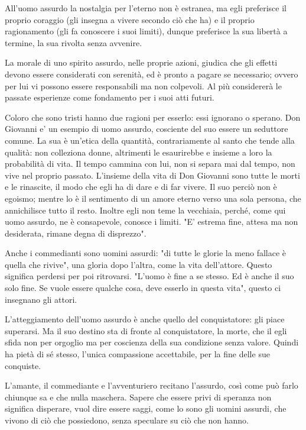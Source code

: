 \documentclass[a4paper,12pt,oneside]{article}%
\begin{document}
All'uomo assurdo la nostalgia per l'eterno non
è estranea, ma egli preferisce il proprio coraggio
(gli insegna a vivere secondo ciò che ha) e il proprio
ragionamento (gli fa conoscere i suoi limiti), dunque
preferisce la sua libertà a termine, la sua rivolta
senza avvenire.

La morale di uno spirito assurdo, nelle proprie
azioni, giudica che gli effetti devono essere
considerati con serenità, ed è pronto a pagare
se necessario; ovvero per lui vi possono essere
responsabili ma non colpevoli. Al più considererà
le passate esperienze come fondamento per i
suoi atti futuri.

Coloro che sono tristi hanno due ragioni per esserlo:
essi ignorano o sperano.
Don Giovanni e' un esempio di uomo assurdo,
cosciente del suo essere un seduttore comune. La
sua è un'etica della quantità, contrariamente
al santo che tende alla qualità: non colleziona
donne, altrimenti le esaurirebbe e insieme a
loro la probabilità di vita. Il tempo cammina
con lui, non si separa mai dal tempo, non vive nel
proprio passato.
L'insieme della vita di Don Giovanni sono tutte
le morti e le rinascite, il modo che egli ha di
dare e di far vivere. Il suo perciò non è egoismo;
mentre lo è il sentimento di un amore eterno
verso una sola persona, che annichilisce tutto il
resto. Inoltre egli non teme la vecchiaia, perché,
come qui uomo assurdo, ne è consapevole, conosce
i limiti. "E' estrema fine, attesa ma non desiderata,
rimane degna di disprezzo".

Anche i commedianti sono uomini assurdi: "di tutte le glorie la meno fallace è quella che
rivive", una gloria dopo l'altra, come la vita
dell'attore. Questo significa perdersi per poi
ritrovarsi.
"L'uomo è fine a se stesso. Ed è anche il suo solo
fine. Se vuole essere qualche cosa, deve esserlo in
questa vita", questo ci insegnano gli attori.

L'atteggiamento dell'uomo assurdo è anche
quello del conquistatore: gli piace superarsi. Ma il
suo destino sta di fronte al conquistatore, la morte,
che il egli sfida non per orgoglio ma
per coscienza della sua condizione senza valore.
Quindi ha pietà di sé stesso, l'unica compassione
accettabile, per la fine delle sue conquiste.

L'amante, il commediante e l'avventuriero recitano
l'assurdo, così come può farlo chiunque sa
e che nulla maschera. Sapere che essere privi di
speranza non significa disperare, vuol dire essere
saggi, come lo sono gli uomini assurdi, che vivono
di ciò che possiedono, senza speculare su ciò che
non hanno.
\end{document}
